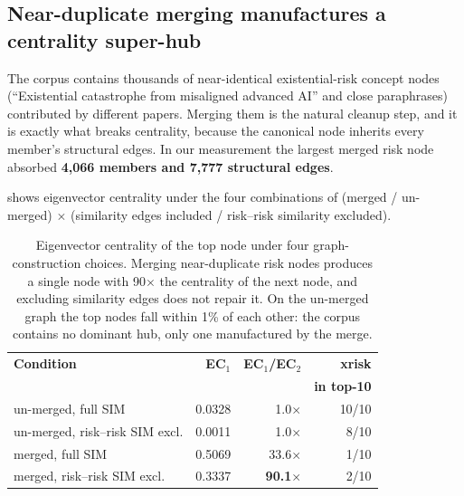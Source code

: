 \documentclass[10pt,twocolumn,letterpaper]{article}
\begin{document}
\subsection{Near-duplicate merging manufactures a centrality super-hub}

The corpus contains thousands of near-identical existential-risk concept nodes
(``Existential catastrophe from misaligned advanced AI'' and close paraphrases)
contributed by different papers. Merging them is the natural cleanup step, and it
is exactly what breaks centrality, because the canonical node inherits every
member's structural edges. In our measurement the largest merged risk node
absorbed \textbf{4{,}066 members and 7{,}777 structural edges}.

 shows eigenvector centrality under the four combinations of
(merged / un-merged) $\times$ (similarity edges included / risk--risk similarity
excluded).

\begin{table}[t]
\centering
\small
\begin{tabular}{lrrr}
\toprule
\textbf{Condition} & \textbf{EC$_1$} & \textbf{EC$_1$/EC$_2$} & \textbf{xrisk} \\
                   &                 &                        & \textbf{in top-10} \\
\midrule
un-merged, full SIM        & 0.0328 & 1.0$\times$ & 10/10 \\
un-merged, risk--risk SIM excl. & 0.0011 & 1.0$\times$ & 8/10 \\
merged, full SIM           & 0.5069 & 33.6$\times$ & 1/10 \\
merged, risk--risk SIM excl.    & 0.3337 & \textbf{90.1$\times$} & 2/10 \\
\bottomrule
\end{tabular}
\caption{Eigenvector centrality of the top node under four graph-construction
choices. Merging near-duplicate risk nodes produces a single node with 90$\times$
the centrality of the next node, and excluding similarity edges does not repair
it. On the un-merged graph the top nodes fall within 1\% of each other: the
corpus contains no dominant hub, only one manufactured by the merge.}
\label{tab:ec}
\end{table}
\end{document}
